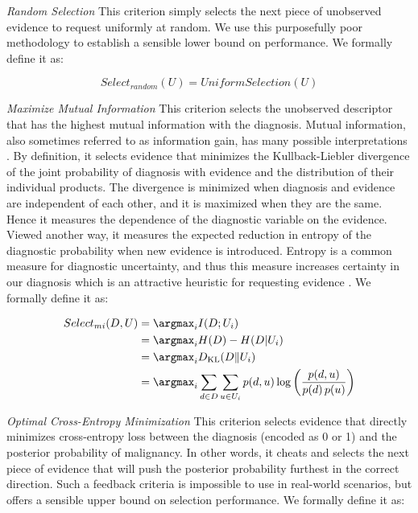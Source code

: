 \emph{Random Selection}
This criterion simply selects the next piece of unobserved evidence to request uniformly at random. We use this purposefully poor methodology to establish a sensible lower bound on performance. We formally define it as:
 
\begin{equation}
Select_{random}(U) = UniformSelection(U)
\end{equation}


\emph{Maximize Mutual Information}
This criterion selects the unobserved descriptor that has the highest mutual information with the diagnosis. Mutual information, also sometimes referred to as information gain, has many possible interpretations \cite{Gray:2011hl}. By definition, it selects evidence that minimizes the Kullback-Liebler divergence of the joint probability of diagnosis with evidence and the distribution of their individual products. The divergence is minimized when diagnosis and evidence are independent of each other, and it is maximized when they are the same. Hence it measures the dependence of the diagnostic variable on the evidence. Viewed another way, it measures the expected reduction in entropy of the diagnostic probability when new evidence is introduced. Entropy is a common measure for diagnostic uncertainty, and thus this measure increases certainty in our diagnosis which is an attractive heuristic for requesting evidence \cite{MacKay:2003wc}. We formally define it as:

\begin{align*}
Select_{mi}(D, U) &= \argmax_{i} I(D; U_i) \\
&= \argmax_{i} H(D)-H(D|U_i) \\
&= \argmax_{i} D_{\mathrm{KL}}(D\|U_i) \\
&= \argmax_{i} \sum_{d \in D} \sum_{u \in U_i} p(d,u) \log{ \left(\frac{p(d,u)}{p(d)\,p(u)}\right)}
\end{align*}




\emph{Optimal Cross-Entropy Minimization}
This criterion selects evidence that directly minimizes cross-entropy loss between the diagnosis (encoded as 0 or 1) and the posterior probability of malignancy. In other words, it cheats and selects the next piece of evidence that will push the posterior probability furthest in the correct direction. Such a feedback criteria is impossible to use in real-world scenarios, but offers a sensible upper bound on selection performance. We formally define it as:

